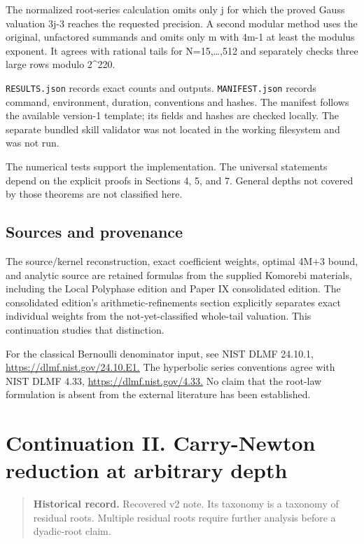 \documentclass[11pt,letterpaper]{article}
\begin{document}
The normalized root-series calculation omits only j for which the proved Gauss valuation 3j-3 reaches the requested precision. A second modular method uses the original, unfactored summands and omits only m with 4m-1 at least the modulus exponent. It agrees with rational tails for N=15,\ldots,512 and separately checks three large rows modulo 2\^{}220.

\texttt{RESULTS.json} records exact counts and outputs. \texttt{MANIFEST.json} records command, environment, duration, conventions and hashes. The manifest follows the available version-1 template; its fields and hashes are checked locally. The separate bundled skill validator was not located in the working filesystem and was not run.

The numerical tests support the implementation. The universal statements depend on the explicit proofs in Sections 4, 5, and 7. General depths not covered by those theorems are not classified here.

\subsection{Sources and provenance}\label{sources-and-provenance}

The source/kernel reconstruction, exact coefficient weights, optimal 4M+3 bound, and analytic source are retained formulas from the supplied Komorebi materials, including the Local Polyphase edition and Paper IX consolidated edition. The consolidated edition's arithmetic-refinements section explicitly separates exact individual weights from the not-yet-classified whole-tail valuation. This continuation studies that distinction.

For the classical Bernoulli denominator input, see NIST DLMF 24.10.1, \url{https://dlmf.nist.gov/24.10.E1.} The hyperbolic series conventions agree with NIST DLMF 4.33, \url{https://dlmf.nist.gov/4.33.} No claim that the root-law formulation is absent from the external literature has been established.

\clearpage

\section{Continuation II. Carry-Newton reduction at arbitrary depth}\label{continuation-ii.-carry-newton-reduction-at-arbitrary-depth}

\begin{quote}
\textbf{Historical record.} Recovered v2 note. Its taxonomy is a taxonomy of residual roots. Multiple residual roots require further analysis before a dyadic-root claim.
\end{quote}
\end{document}
